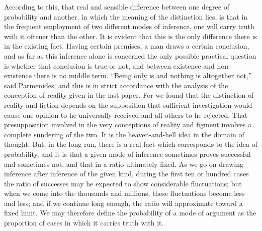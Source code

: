 According to this, that real and sensible difference between one degree of probability and another, in which the meaning of the distinction lies, is that in the frequent employment of two different modes of inference, one will carry truth with it oftener than the other. It is evident that this is the only difference there is in the existing fact. Having certain premises, a man draws a certain conclusion, and as far as this inference alone is concerned the only possible practical question is whether that conclusion is true or not, and between existence and non-existence there is no middle term. ``Being only is and nothing is altogether not,'' said Parmenides; and this is in strict accordance with the analysis of the conception of reality given in the last paper. For we found that the distinction of reality and fiction depends on the supposition that sufficient investigation would cause one opinion to he universally received and all others to he rejected. That presupposition involved in the very conceptions of reality and figment involves a complete sundering of the two. It is the heaven-and-hell idea in the domain of thought. But, in the long run, there is a real fact which corresponds to the idea of probability, and it is that a given mode of inference sometimes proves successful and sometimes not, and that in a ratio ultimately fixed. As we go on drawing inference after inference of the given kind, during the first ten or hundred cases the ratio of successes may he expected to show considerable fluctuations; but when we come into the thousands and millions, these fluctuations become less and less; and if we continue long enough, the ratio will approximate toward a fixed limit. We may therefore define the probability of a mode of argument as the proportion of cases in which it carries truth with it.

